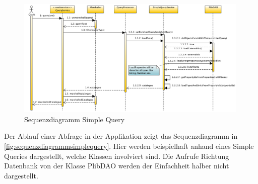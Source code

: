 \begin{figure}[htbp]
	\centering
		\includegraphics[width=0.99\textwidth]{images/plib_simple_query_sequence_diagram.png}
		\caption{Sequenzdiagramm Simple Query}
	\label{fig:sequenzdiagrammsimplequery}
\end{figure}

Der Ablauf einer Abfrage in der Applikation zeigt das Sequenzdiagramm in \autoref{fig:sequenzdiagrammsimplequery}. Hier werden beispielhaft anhand eines Simple Queries dargestellt, welche Klassen involviert sind. Die Aufrufe Richtung Datenbank von der Klasse PlibDAO werden der Einfachheit halber nicht dargestellt. 

